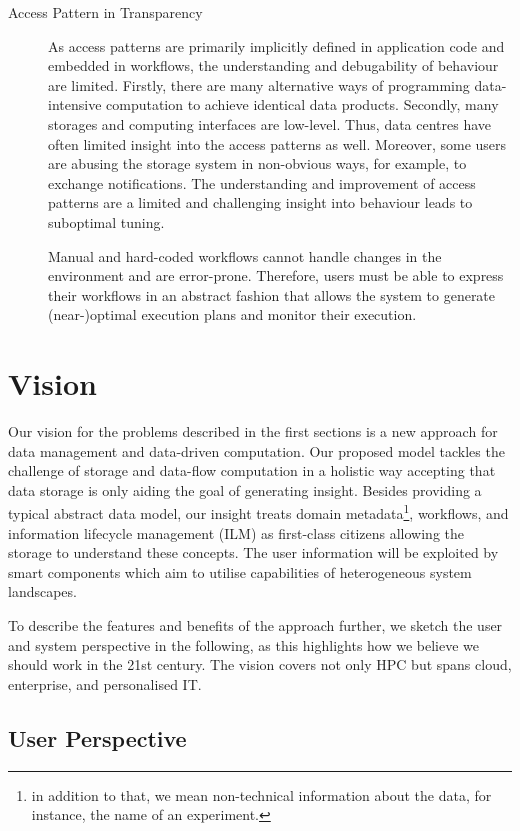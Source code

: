 \documentclass[a4paper]{article}
\begin{document}
{{\begin{description}
\item[Access Pattern in Transparency]

As access patterns are primarily implicitly defined in application code and embedded in workflows, the understanding and debugability of behaviour are limited.
Firstly, there are many alternative ways of programming data-intensive computation to achieve identical data products.
Secondly, many storages and computing interfaces are low-level.
Thus, data centres have often limited insight into the access patterns as well.
Moreover, some users are abusing the storage system in non-obvious ways, for example, to exchange notifications.
The understanding and improvement of access patterns are a limited and challenging insight into behaviour leads to suboptimal tuning.

Manual and hard-coded workflows cannot handle changes in the environment and are error-prone.
Therefore, users must be able to express their workflows in an abstract fashion that allows the system to generate (near-)optimal execution plans and monitor their execution.

\end{description}

\section{Vision}

Our vision for the problems described in the first sections is a new approach for data management and data-driven computation.
Our proposed model tackles the challenge of storage and data-flow computation in a holistic way accepting that data storage is only aiding the goal of generating insight.
Besides providing a typical abstract data model, our insight treats domain metadata\footnote{ in addition to that, we mean non-technical information about the data, for instance, the name of an experiment.}, workflows, and information lifecycle management (ILM) as first-class citizens allowing the storage to understand these concepts.
The user information will be exploited by smart components which aim to utilise capabilities of heterogeneous system landscapes.

To describe the features and benefits of the approach further, we sketch the user and system perspective in the following, as this highlights how we believe we should work in the 21st century.
The vision covers not only HPC but spans cloud, enterprise, and personalised IT.

\subsection{User Perspective}

}}
\end{document}
